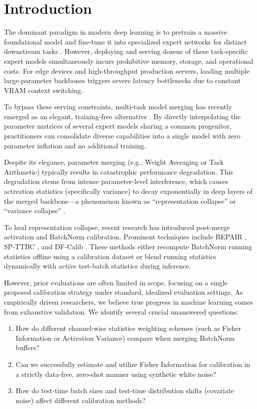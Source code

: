 \documentclass{article}
\theoremstyle{plain}
\theoremstyle{definition}
\theoremstyle{remark}
\begin{document}
\section{Introduction}
\label{sec:intro}
The dominant paradigm in modern deep learning is to pretrain a massive foundational model and fine-tune it into specialized expert networks for distinct downstream tasks \cite{vaswani17attention, devlin18bert, deng09imagenet}. However, deploying and serving dozens of these task-specific expert models simultaneously incurs prohibitive memory, storage, and operational costs. For edge devices and high-throughput production servers, loading multiple large-parameter backbones triggers severe latency bottlenecks due to constant VRAM context switching.

To bypass these serving constraints, multi-task model merging has recently emerged as an elegant, training-free alternative \cite{wortsman22modelsoups, ilharco22editing}. By directly interpolating the parameter matrices of several expert models sharing a common progenitor, practitioners can consolidate diverse capabilities into a single model with zero parameter inflation and no additional training. 

Despite its elegance, parameter merging (e.g., Weight Averaging or Task Arithmetic) typically results in catastrophic performance degradation. This degradation stems from intense parameter-level interference, which causes activation statistics (specifically variance) to decay exponentially in deep layers of the merged backbone---a phenomenon known as ``representation collapse'' or ``variance collapse'' \cite{jordan23repair}. 

To heal representation collapse, recent research has introduced post-merge activation and BatchNorm calibration. Prominent techniques include REPAIR \cite{jordan23repair}, SP-TTBC \cite{s5_spttbc}, and DF-Calib \cite{s10_dfcalib}. These methods either recompute BatchNorm running statistics offline using a calibration dataset or blend running statistics dynamically with active test-batch statistics during inference. 

However, prior evaluations are often limited in scope, focusing on a single proposed calibration strategy under standard, idealized evaluation settings. As empirically driven researchers, we believe true progress in machine learning comes from exhaustive validation. We identify several crucial unanswered questions:
\begin{enumerate}
    \item How do different channel-wise statistics weighting schemes (such as Fisher Information or Activation Variance) compare when merging BatchNorm buffers?
    \item Can we successfully estimate and utilize Fisher Information for calibration in a strictly data-free, zero-shot manner using synthetic white noise?
    \item How do test-time batch sizes and test-time distribution shifts (covariate noise) affect different calibration methods?
\end{enumerate}
\end{document}
